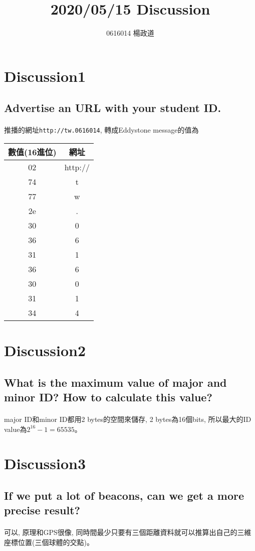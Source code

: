 \title{2020/05/15 Discussion}
\author{0616014 楊政道}
\maketitle
\thispagestyle{fancy}
\section{Discussion1}
\subsection{Advertise an URL with your student ID.}
\paragraph{}
推播的網址\texttt{http://tw.0616014}, 轉成Eddystone message的值為
\begin{center}
 \begin{tabular}{||c | c||}
 \hline
 數值(16進位) & 網址\\ [0.5ex]
 \hline\hline
 02 & http:// \\
 \hline
 74 & t \\
 \hline
 77 & w \\
 \hline
 2e & . \\
 \hline
 30 & 0 \\
 \hline
 36 & 6 \\
 \hline
 31 & 1 \\
 \hline
 36 & 6 \\
 \hline
 30 & 0 \\
 \hline
 31 & 1 \\
 \hline
 34 & 4 \\
 \hline
\end{tabular}
\end{center}
\section{Discussion2}
\subsection{What is the maximum value of major and minor ID? How to calculate this value?}
\paragraph{}
major ID和minor ID都用2 bytes的空間來儲存, 2 bytes為16個bits, 所以最大的ID value為$2^{16} - 1 = 65535$。
\section{Discussion3}
\subsection{If we put a lot of beacons, can we get a more precise result?}
\paragraph{}
可以, 原理和GPS很像, 同時間最少只要有三個距離資料就可以推算出自己的三維座標位置(三個球體的交點)。
